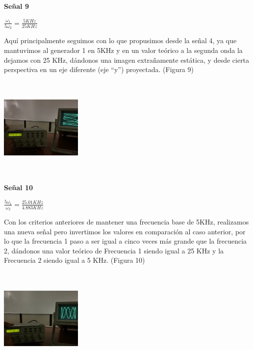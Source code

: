 \documentclass[10pt]{article}
\begin{document}
\begin{multicols}{2}
\textbf{Señal 9}\\
\begin{center}
    
$\frac{\omega_{1}}{5\omega_{2}}=\frac{5 KHz}{25 KHz}$\\
\end{center}
Aquí principalmente seguimos con lo que propusimos desde la señal 4, ya que mantuvimos al generador 1 en 5KHz y en un valor teórico a la segunda onda la dejamos con 25 KHz, dándonos una imagen extrañamente estática, y desde cierta perspectiva en un eje diferente (eje “y”) proyectada. (Figura 9)
\begin{center}
	\includegraphics[width=4cm,height=5cm]{Imagenes/9.png}
	\label{fig:9}
\end{center}

\textbf{Señal 10}\\
\begin{center}
    
$\frac{5\omega_1}{\omega_{2}}=\frac{25.01 KHz}{4.883 KHz}$\\
\end{center}
Con los criterios anteriores de mantener una frecuencia base de 5KHz, realizamos una nueva señal pero invertimos los valores en comparación al caso anterior, por lo que la frecuencia 1 paso a ser igual a cinco veces más grande que la frecuencia 2, dándonos una valor teórico de Frecuencia 1 siendo igual a 25 KHz y la Frecuencia 2 siendo igual a 5 KHz. (Figura 10)

\begin{center}
	\includegraphics[width=4cm,height=5cm]{Imagenes/11.png}
	\label{fig:10}
\end{center}


\end{multicols}
\end{document}
